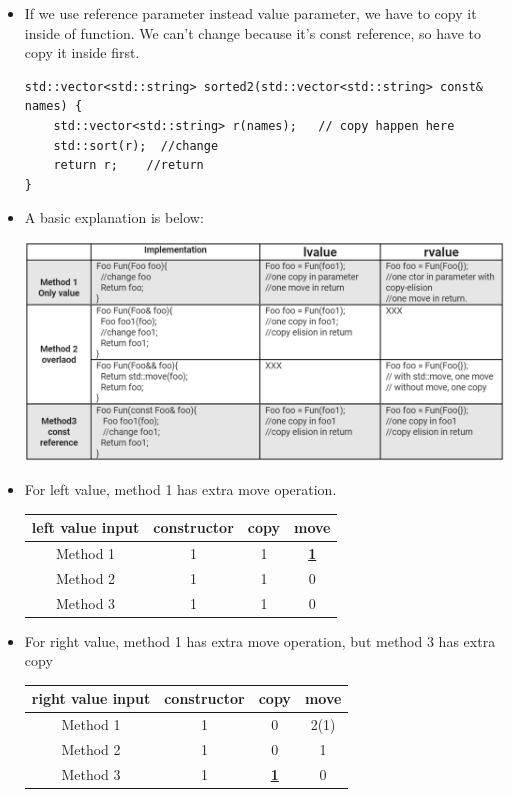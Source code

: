 \documentclass[a4paper,11pt,twoside]{book}
\begin{document}
\begin{itemize}
    \item If we use reference parameter instead value parameter, we have to copy it inside of function. We can't change because it's const reference, so have to copy it inside first. 

\begin{lstlisting}[numbers=none]
std::vector<std::string> sorted2(std::vector<std::string> const& names) {
	std::vector<std::string> r(names);   // copy happen here
	std::sort(r);  //change
	return r;    //return
}
\end{lstlisting}



\item A basic explanation is below:
\begin{center}
	\includegraphics[scale=0.5]{pics/copy1.png}
\end{center}

\item For left value, method 1 has extra move operation.

\begin{center}
\begin{tabular}{|c|c|c|c|}
	\hline
	left value input	& constructor & copy & move  \\
	\hline
	Method 1 & 1 & 1 & \textbf{\underline{1}} \\
	\hline
	Method 2&  1& 1 & 0  \\
	\hline
	Method 3&  1&  1& 0 \\
	\hline
\end{tabular}
\end{center}

\item For right value, method 1 has extra move operation, but method 3 has extra copy

\begin{center}
\begin{tabular}{|c|c|c|c|}
	\hline
	right value input	& constructor & copy & move  \\
	\hline
	Method 1 & 1 & 0 & 2(1)  \\
	\hline
	Method 2 & 1 & 0 & 1 \\
	\hline
	Method 3 & 1 & \textbf{\underline{1}} & 0 \\
	\hline
\end{tabular}
\end{center}


\end{itemize}
\end{document}
